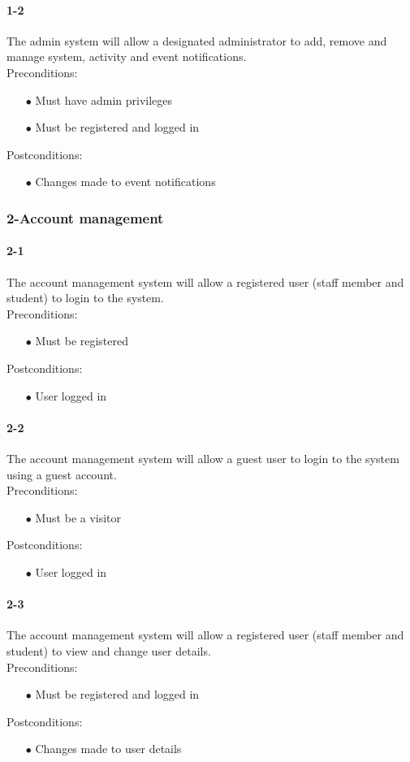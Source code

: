 \documentclass[a4paper,12pt]{article}
\begin{document}
\paragraph{1-2}
The admin system will allow a designated administrator to add, remove and manage system, activity and event notifications.\\
Preconditions:
\begin{itemize}
	\item[$\bullet$] Must have admin privileges
	\item[$\bullet$] Must be registered and logged in
\end{itemize}
Postconditions:
\begin{itemize}
	\item[$\bullet$] Changes made to event notifications
\end{itemize}
\subsubsection{2-Account management}
\paragraph{2-1}
The account management system will allow a registered user (staff member and student) to login to the system.\\
Preconditions:
\begin{itemize}
	\item[$\bullet$] Must be registered
\end{itemize}
Postconditions:
\begin{itemize}
	\item[$\bullet$] User logged in
\end{itemize}
\paragraph{2-2}
The account management system will allow a guest user to login to the system using a guest account.\\
Preconditions:
\begin{itemize}
	\item[$\bullet$] Must be a visitor
\end{itemize}
Postconditions:
\begin{itemize}
	\item[$\bullet$] User logged in
\end{itemize}
\paragraph{2-3}
The account management system will allow a registered user (staff member and student) to view and change user details.\\
Preconditions:
\begin{itemize}
	\item[$\bullet$] Must be registered and logged in
\end{itemize}
Postconditions:
\begin{itemize}
	\item[$\bullet$] Changes made to user details
\end{itemize}
\end{document}
